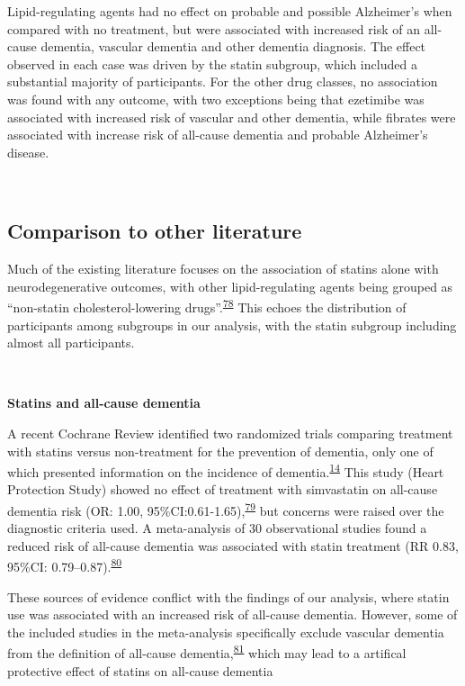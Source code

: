 \documentclass[a4paper, twoside]{templates/ociamthesis}
\begin{document}
Lipid-regulating agents had no effect on probable and possible Alzheimer's when compared with no treatment, but were associated with increased risk of an all-cause dementia, vascular dementia and other dementia diagnosis. The effect observed in each case was driven by the statin subgroup, which included a substantial majority of participants. For the other drug classes, no association was found with any outcome, with two exceptions being that ezetimibe was associated with increased risk of vascular and other dementia, while fibrates were associated with increase risk of all-cause dementia and probable Alzheimer's disease.

~

\hypertarget{comparison-to-other-literature}{%
\subsection{Comparison to other literature}\label{comparison-to-other-literature}}

Much of the existing literature focuses on the association of statins alone with neurodegenerative outcomes, with other lipid-regulating agents being grouped as ``non-statin cholesterol-lowering drugs''.\textsuperscript{\protect\hyperlink{ref-ancelin2012}{78}} This echoes the distribution of participants among subgroups in our analysis, with the statin subgroup including almost all participants.

~

\textbf{Statins and all-cause dementia}

A recent Cochrane Review identified two randomized trials comparing treatment with statins versus non-treatment for the prevention of dementia, only one of which presented information on the incidence of dementia.\textsuperscript{\protect\hyperlink{ref-mcguinness2016a}{14}} This study (Heart Protection Study) showed no effect of treatment with simvastatin on all-cause dementia risk (OR: 1.00, 95\%CI:0.61-1.65),\textsuperscript{\protect\hyperlink{ref-heartprotectionstudycollaborativegroup2002}{79}} but concerns were raised over the diagnostic criteria used. A meta-analysis of 30 observational studies found a reduced risk of all-cause dementia was associated with statin treatment (RR 0.83, 95\%CI: 0.79--0.87).\textsuperscript{\protect\hyperlink{ref-poly2020}{80}}

These sources of evidence conflict with the findings of our analysis, where statin use was associated with an increased risk of all-cause dementia. However, some of the included studies in the meta-analysis specifically exclude vascular dementia from the definition of all-cause dementia,\textsuperscript{\protect\hyperlink{ref-chao2015}{81}} which may lead to a artifical protective effect of statins on all-cause dementia
\end{document}
